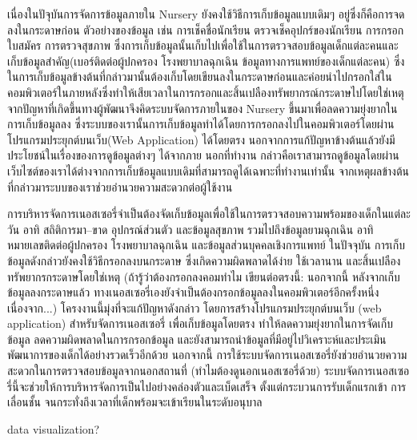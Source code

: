 \maketitle
\makesignature

\ifproject
\begin{abstractTH}
เนื่องในปัจุบันการจัดการข้อมูลภายใน Nursery ยังคงใช้วิธีการเก็บข้อมูลแบบเดิมๆ อยู่ซึ่งก็คือการจดลงในกระดาษก่อน ตัวอย่างของข้อมูล เช่น การเช็คชื่อนักเรียน ตรวจเช็คอุปกร์ของนักเรียน การกรอกใบสมัคร การตรวจสุขภาพ 
\enskip
ซึ่งการเก็บข้อมูลนั้นเก็บไปเพื่อใช้ในการตรวจสอบข้อมูลเด็กแต่ละคนและเก็บข้อมูลสำคัญ(เบอร์ติดต่อผู้ปกครอง โรงพยาบาลฉุกเฉิน ข้อมูลทางการแพทย์ของเด็กแต่ละคน)
\enskip
ซึ่งในการเก็บข้อมูลข้างต้นที่กล่าวมานั้นต้องเก็บโดยเขียนลงในกระดาษก่อนและค่อยนำไปกรอกใส่ในคอมพิวเตอร์ในภายหลังซึ่งทำให้เสียเวลาในการกรอกและสิ้นเปลืองทรัพยากรณ์กระดาษไปโดยใช่เหตุ 
\enskip 
จากปัญหาที่เกิดขึ้นทางผู้พัฒนาจึงคิดระบบจัดการภายในของ Nursery ขึ้นมาเพื่อลดความยุ่งยากในการเก็บข้อมูลลง ซึ่งระบบของเรานั้นการเก็บข้อมูลทำได้โดยการกรอกลงไปในคอมพิวเตอร์โดยผ่านโปรแกรมประยุกต์บนเว็บ(Web Application) ได้โดยตรง
\enskip
นอกจากการแก้ปัญหาข้างต้นแล้วยังมีประโยชน์ในเรื่องของการดูข้อมูลต่างๆ ได้จากภาย นอกที่ทำงาน กล่าวคือเราสามารถดูข้อมูลโดยผ่านเว็บไซต์ของเราได้ต่างจากการเก็บข้อมูลแบบเดิมที่สามารถดูได้เฉพาะที่ทำงานเท่านั้น จากเหตุผลข้างต้นที่กล่าวมาระบบของเราช่วยอำนวยความสะดวกต่อผู้ใช้งาน

\textcolor{Green4}{
การบริหารจัดการเนอสเซอรี่จำเป็นต้องจัดเก็บข้อมูลเพื่อใช้ในการตรวจสอบความพร้อมของเด็กในแต่ละวัน อาทิ สถิติการมา--ขาด อุปกรณ์ส่วนตัว และข้อมูลสุขภาพ รวมไปถึงข้อมูลยามฉุกเฉิน อาทิ หมายเลขติดต่อผู้ปกครอง โรงพยาบาลฉุกเฉิน และข้อมูลส่วนบุคคลเชิงการแพทย์
\enskip
ในปัจจุบัน การเก็บข้อมูลดังกล่าวยังคงใช้วิธีกรอกลงบนกระดาษ ซึ่งเกิดความผิดพลาดได้ง่าย ใช้เวลานาน และสิ้นเปลืองทรัพยากรกระดาษโดยใช่เหตุ
(ถ้ารู้ว่าต้องกรอกลงคอมทำไม เขียนต่อตรงนี้: นอกจากนี้ หลังจากเก็บข้อมูลลงกระดาษแล้ว ทางเนอสเซอรี่เองยังจำเป็นต้องกรอกข้อมูลลงในคอมพิวเตอร์อีกครั้งหนึ่ง เนื่องจาก...)
\enskip
โครงงานนี้มุ่งที่จะแก้ปัญหาดังกล่าว โดยการสร้างโปรแกรมประยุกต์บนเว็บ (web application) สำหรับจัดการเนอสเซอรี่ เพื่อเก็บข้อมูลโดยตรง ทำให้ลดความยุ่งยากในการจัดเก็บข้อมูล ลดความผิดพลาดในการกรอกข้อมูล และยังสามารถนำข้อมูลที่มีอยู่ไปวิเคราะห์และประเมินพัฒนาการของเด็กได้อย่างรวดเร็วอีกด้วย
\enskip
นอกจากนี้ การใช้ระบบจัดการเนอสเซอรี่ยังช่วยอำนวยความสะดวกในการตรวจสอบข้อมูลจากนอกสถานที่ (ทำไมต้องดูนอกเนอสเซอรี่ด้วย)
\enskip
ระบบจัดการเนอสเซอรี่นี้จะช่วยให้การบริหารจัดการเป็นไปอย่างคล่องตัวและเบ็ดเสร็จ ตั้งแต่กระบวนการรับเด็กแรกเข้า การเลื่อนชั้น จนกระทั่งถึงเวลาที่เด็กพร้อมจะเข้าเรียนในระดับอนุบาล
}

data visualization?
\end{abstractTH}

